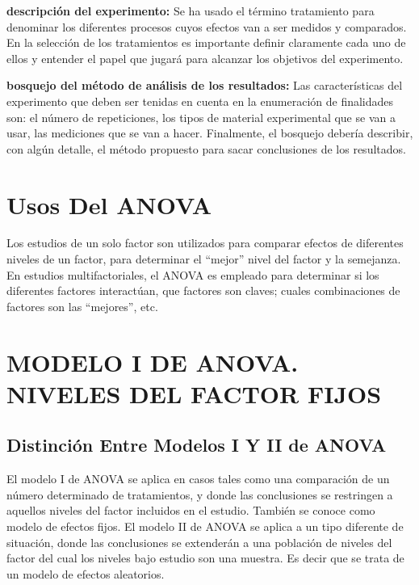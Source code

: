 \documentclass[]{book}
\theoremstyle{definition}
\theoremstyle{definition}
\theoremstyle{definition}
\theoremstyle{remark}
\begin{document}
\textbf{descripción del experimento:} Se ha usado el término tratamiento
para denominar los diferentes procesos cuyos efectos van a ser medidos y
comparados. En la selección de los tratamientos es importante definir
claramente cada uno de ellos y entender el papel que jugará para
alcanzar los objetivos del experimento.

\textbf{bosquejo del método de análisis de los resultados:} Las
características del experimento que deben ser tenidas en cuenta en la
enumeración de finalidades son: el número de repeticiones, los tipos de
material experimental que se van a usar, las mediciones que se van a
hacer. Finalmente, el bosquejo debería describir, con algún detalle, el
método propuesto para sacar conclusiones de los resultados.

\hypertarget{usos-del-anova}{%
\section{Usos Del ANOVA}\label{usos-del-anova}}

Los estudios de un solo factor son utilizados para comparar efectos de
diferentes niveles de un factor, para determinar el ``mejor'' nivel del
factor y la semejanza. En estudios multifactoriales, el ANOVA es
empleado para determinar si los diferentes factores interactúan, que
factores son claves; cuales combinaciones de factores son las
``mejores'', etc.

\hypertarget{modelo-i-de-anova.-niveles-del-factor-fijos}{%
\section{MODELO I DE ANOVA. NIVELES DEL FACTOR
FIJOS}\label{modelo-i-de-anova.-niveles-del-factor-fijos}}

\hypertarget{distincion-entre-modelos-i-y-ii-de-anova}{%
\subsection{Distinción Entre Modelos I Y II de
ANOVA}\label{distincion-entre-modelos-i-y-ii-de-anova}}

El modelo I de ANOVA se aplica en casos tales como una comparación de un
número determinado de tratamientos, y donde las conclusiones se
restringen a aquellos niveles del factor incluidos en el estudio.
También se conoce como modelo de efectos fijos. El modelo II de ANOVA se
aplica a un tipo diferente de situación, donde las conclusiones se
extenderán a una población de niveles del factor del cual los niveles
bajo estudio son una muestra. Es decir que se trata de un modelo de
efectos aleatorios.
\end{document}
